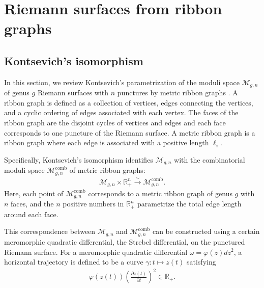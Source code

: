 \documentclass[12pt]{article}
\def\ie{\begin{equation}\begin{aligned}}
\def\fe{\end{aligned}\end{equation}}
\numberwithin{equation}{section}
\begin{document}
\section{Riemann surfaces from ribbon graphs}

\label{geometrysection}

\subsection{Kontsevich's isomorphism}
\label{sec:Kontsevich}

In this section, we review Kontsevich's parametrization of the moduli space $\mathcal{M}_{g,n}$ of genus $g$ Riemann surfaces with $n$ punctures by metric ribbon graphs \cite{Kontsevich:1992ti}. A ribbon graph is defined as a collection of vertices, edges connecting the vertices, and a cyclic ordering of edges associated with each vertex. The faces of the ribbon graph are the disjoint cycles of vertices and edges and each face corresponds to one puncture of the Riemann surface. A metric ribbon graph is a ribbon graph where each edge is associated with a positive length $\ell_i$.

Specifically, Kontsevich's isomorphism identifies $\mathcal{M}_{g,n}$ with the combinatorial moduli space $\mathcal{M}_{g,n}^{\text{comb}}$ of metric ribbon graphs:
\ie
\mathcal{M}_{g,n}\times \mathbb{R}_+^n \xrightarrow{\sim} \mathcal{M}_{g,n}^{\text{comb}}.
\fe
Here, each point of $\mathcal{M}_{g,n}^{\text{comb}}$ corresponds to a metric ribbon graph of genus $g$ with $n$ faces, and the $n$ positive numbers in $\mathbb{R}_+^n$ parametrize the total edge length around each face.

This correspondence between $\mathcal{M}_{g,n}$ and $\mathcal{M}^{\text{comb}}_{g,n}$ can be constructed using a certain meromorphic quadratic differential, the Strebel differential, on the punctured Riemann surface. For a meromorphic quadratic differential $\omega=\varphi(z)dz^2$, a horizontal trajectory is defined to be a curve $\gamma:t\mapsto z(t)$ satisfying
\ie
\varphi(z(t))\left(\frac{\partial z(t)}{\partial t}\right)^2\in \mathbb{R}_{+}.
\fe
\end{document}
